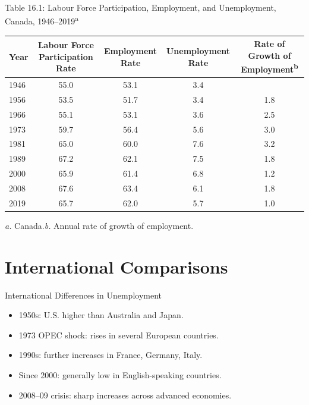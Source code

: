 \documentclass[aspectratio=169]{beamer}
\begin{document}
\begin{frame}{Table 16.1: Labour Force Participation, Employment, and Unemployment, Canada, 1946--2019\textsuperscript{a}}
\transfade
\scriptsize
\begin{tabular}{lcccc}
\toprule
\textbf{Year} & \textbf{Labour Force Participation Rate} & \textbf{Employment Rate} & \textbf{Unemployment Rate} & \textbf{Rate of Growth of Employment\textsuperscript{b}} \\
\midrule
1946 & 55.0 & 53.1 & 3.4 &  \\
1956 & 53.5 & 51.7 & 3.4 & 1.8 \\
1966 & 55.1 & 53.1 & 3.6 & 2.5 \\
1973 & 59.7 & 56.4 & 5.6 & 3.0 \\
1981 & 65.0 & 60.0 & 7.6 & 3.2 \\
1989 & 67.2 & 62.1 & 7.5 & 1.8 \\
2000 & 65.9 & 61.4 & 6.8 & 1.2 \\
2008 & 67.6 & 63.4 & 6.1 & 1.8 \\
2019 & 65.7 & 62.0 & 5.7 & 1.0 \\
\bottomrule
\end{tabular}

\vspace{0.25em}
\scriptsize \textit{a.} Canada.\quad \textit{b.} Annual rate of growth of employment.
\end{frame}

\section{International Comparisons}

\begin{frame}{International Differences in Unemployment}
\transfade
\begin{itemize}[<+->]
  \item 1950s: U.S. higher than Australia and Japan.
  \item 1973 OPEC shock: rises in several European countries.
  \item 1990s: further increases in France, Germany, Italy.
  \item Since 2000: generally low in English-speaking countries.
  \item 2008--09 crisis: sharp increases across advanced economies.
\end{itemize}
\end{frame}
\end{document}
